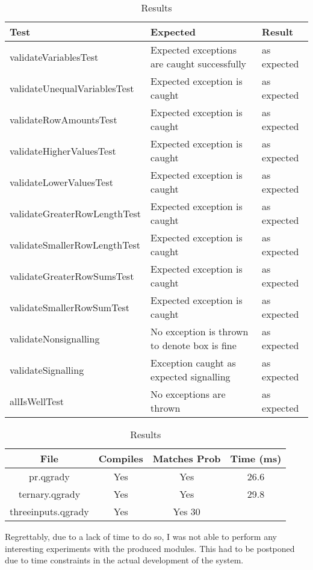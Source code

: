 \documentclass[report.tex]{subfiles}
\begin{document}
\begin{table}[H]
    \centering
    \begin{tabular}{l | p{6cm} | l}
    Test & Expected & Result \\    
    \hline
    validateVariablesTest & Expected exceptions are caught successfully 
    & as expected \\
    validateUnequalVariablesTest & Expected exception is caught 
    & as expected \\
    validateRowAmountsTest & Expected exception is caught & as expected \\
    validateHigherValuesTest & Expected exception is caught & as expected \\
    validateLowerValuesTest & Expected exception is caught & as expected \\
    validateGreaterRowLengthTest & Expected exception is caught & as expected \\
    validateSmallerRowLengthTest & Expected exception is caught & as expected \\
    validateGreaterRowSumsTest & Expected exception is caught & as expected \\
    validateSmallerRowSumTest & Expected exception is caught & as expected \\
    validateNonsignalling & No exception is thrown to denote box is fine & as expected \\
    validateSignalling & Exception caught as expected signalling & as expected \\
    allIsWellTest & No exceptions are thrown & as expected \\
    \end{tabular}
    \caption{Results}
  \label{tab:semantics_result}
\end{table}

\begin{table}[H]
  \centering
  \begin{tabular}{c | c | c | c}
    File & Compiles & Matches Prob & Time (ms)\\
    \hline
    pr.qgrady & Yes & Yes & 26.6 \\
    ternary.qgrady & Yes & Yes & 29.8 \\
    threeinputs.qgrady & Yes & Yes 30\\
  \end{tabular}
  \caption{Results}
  \label{tab:prism_result}
\end{table}

Regrettably, due to a lack of time to do so, I was not able to perform any
interesting experiments with the produced modules. This had to be postponed
due to time constraints in the actual development of the system.
\end{document}
